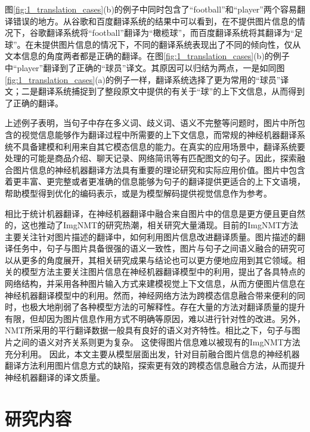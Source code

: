 图\ref{fig:1_translation_cases}(b)的例子中同时包含了“football”和“player”两个容易翻译错误的地方。从谷歌和百度翻译系统的结果中可以看到，在不提供图片信息的情况下，谷歌翻译系统将“football”翻译为“橄榄球”，而百度翻译系统将其翻译为“足球”。在未提供图片信息的情况下，不同的翻译系统表现出了不同的倾向性，仅从文本信息的角度两者都是正确的翻译。在图\ref{fig:1_translation_cases}(b)的例子中“player”翻译到了正确的“球员”译文。其原因可以归结为两点，一是如同图\ref{fig:1_translation_cases}(a)的例子一样，翻译系统选择了更为常用的“球员”译文；二是翻译系统捕捉到了整段原文中提供的有关于“球”的上下文信息，从而得到了正确的翻译。


上述例子表明，当句子中存在多义词、歧义词、语义不完整等问题时，图片中所包含的视觉信息能够作为翻译过程中所需要的上下文信息，而常规的神经机器翻译系统不具备建模和利用来自其它模态信息的能力。在真实的应用场景中，翻译系统要处理的可能是商品介绍、聊天记录、网络简讯等有匹配图文的句子。因此，探索融合图片信息的神经机器翻译方法具有重要的理论研究和实际应用价值。图片中包含着更丰富、更完整或者更准确的信息能够为句子的翻译提供更适合的上下文语境，帮助模型得到优化的编码表示，或是为模型解码提供视觉信息作为参考。

相比于统计机器翻译，在神经机器翻译中融合来自图片中的信息是更方便且更自然的，这也推动了ImgNMT的研究热潮，相关研究大量涌现。目前的ImgNMT方法主要关注针对图片描述的翻译中，如何利用图片信息改进翻译质量。图片描述的翻译任务中，句子与图片具备很强的语义一致性，图片与句子之间语义融合的研究可以从更多的角度展开，其相关研究成果与结论也可以更方便地应用到其它领域。相关的模型方法主要关注图片信息在神经机器翻译模型中的利用，提出了各具特点的网络结构，并采用各种图片输入方式来建模视觉上下文信息，从而方便图片信息在神经机器翻译模型中的利用。然而，神经网络方法为跨模态信息融合带来便利的同时，也极大地削弱了各种模型方法的可解释性。存在大量的方法对翻译质量的提升有限，但却因为图片信息作用方式不明确等原因，难以进行针对性的改进。另外，NMT所采用的平行翻译数据一般具有良好的语义对齐特性。相比之下，句子与图片之间的语义对齐关系则更为复杂。
这使得图片信息难以被现有的ImgNMT方法充分利用。%
因此，本文主要从模型层面出发，针对目前融合图片信息的神经机器翻译方法利用图片信息方式的缺陷，探索更有效的跨模态信息融合方法，从而提升神经机器翻译的译文质量。


\section{研究内容}

